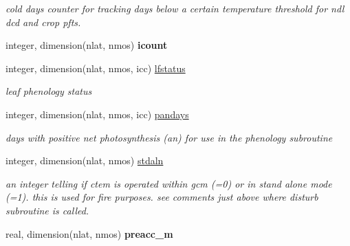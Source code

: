\begin{DoxyCompactItemize}
\begin{DoxyCompactList}\small\item\em cold days counter for tracking days below a certain temperature threshold for ndl dcd and crop pfts. \end{DoxyCompactList}\item 
\hypertarget{structctem__statevars_1_1veg__rot_af822c9d22971382570e602015b27c8f3}{}integer, dimension(nlat, nmos) {\bfseries icount}\label{structctem__statevars_1_1veg__rot_af822c9d22971382570e602015b27c8f3}

\item 
\hypertarget{structctem__statevars_1_1veg__rot_a1193dbd4a8c0e9d08fd4e432f28b3741}{}integer, dimension(nlat, nmos, icc) \hyperlink{structctem__statevars_1_1veg__rot_a1193dbd4a8c0e9d08fd4e432f28b3741}{lfstatus}\label{structctem__statevars_1_1veg__rot_a1193dbd4a8c0e9d08fd4e432f28b3741}

\begin{DoxyCompactList}\small\item\em leaf phenology status \end{DoxyCompactList}\item 
\hypertarget{structctem__statevars_1_1veg__rot_a1135648e62a6dca1005c33b42df05084}{}integer, dimension(nlat, nmos, icc) \hyperlink{structctem__statevars_1_1veg__rot_a1135648e62a6dca1005c33b42df05084}{pandays}\label{structctem__statevars_1_1veg__rot_a1135648e62a6dca1005c33b42df05084}

\begin{DoxyCompactList}\small\item\em days with positive net photosynthesis (an) for use in the phenology subroutine \end{DoxyCompactList}\item 
\hypertarget{structctem__statevars_1_1veg__rot_a359ff9e01cf362c01a263412a2ab751f}{}integer, dimension(nlat, nmos) \hyperlink{structctem__statevars_1_1veg__rot_a359ff9e01cf362c01a263412a2ab751f}{stdaln}\label{structctem__statevars_1_1veg__rot_a359ff9e01cf362c01a263412a2ab751f}

\begin{DoxyCompactList}\small\item\em an integer telling if ctem is operated within gcm (=0) or in stand alone mode (=1). this is used for fire purposes. see comments just above where disturb subroutine is called. \end{DoxyCompactList}\item 
\hypertarget{structctem__statevars_1_1veg__rot_a039c659636b161402ef54678b4b8c769}{}real, dimension(nlat, nmos) {\bfseries preacc\+\_\+m}\label{structctem__statevars_1_1veg__rot_a039c659636b161402ef54678b4b8c769}


\end{DoxyCompactItemize}
